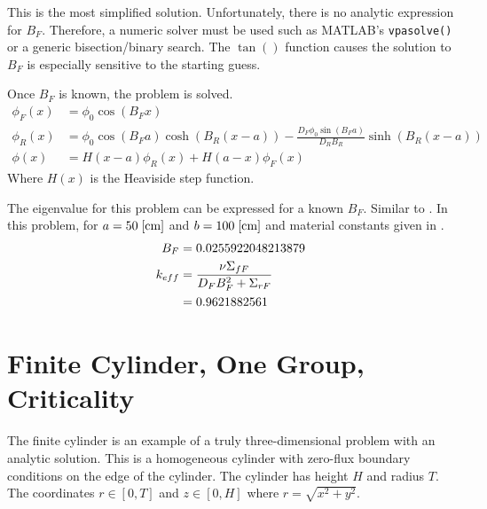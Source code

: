   This is the most simplified solution. Unfortunately, there is no analytic
  expression for $B_F$. Therefore, a numeric solver must be used such as 
  MATLAB's \texttt{vpasolve()} or a generic bisection/binary search. The $\tan()$ 
  function causes the solution to $B_F$ is especially sensitive to the starting
  guess.
  
  Once $B_F$ is known, the problem is solved.
  \begin{align}
    \phi_F(x) &= \phi_0 \cos(B_F x)\\
    \phi_R(x) &= \phi_0 \cos(B_F a) \cosh(B_R (x-a)) 
      - \frac{D_F \phi_0 \sin(B_F a)}{D_R B_R} \sinh(B_R (x-a))\\
    \label{eq:analytic_2reg}
    \phi(x) &= H(x-a)\phi_R(x) + H(a-x)\phi_F(x)
  \end{align}
  Where $H(x)$ is the Heaviside step function.  
  
  The eigenvalue for this problem can be expressed for a known $B_F$. Similar 
  to . In this problem, for $a=50 \;\text{[{cm}]}$ and
  $b=100 \;\text{[{cm}]}$ and material constants given in .
  \begin{align}
    B_F &= 0.0255922048213879 \\
    k_{eff} &= \frac{\nu\Sigma_{fF}}{D_F B_F^2 + \Sigma_{rF}} \\
    &= 0.9621882561
  \end{align}
  
\section{Finite Cylinder, One Group, Criticality}
  \label{sec:deriv_finite_cyl}
  The finite cylinder is an example of a truly three-dimensional problem with
  an analytic solution. This is a homogeneous cylinder with zero-flux boundary
  conditions on the edge of the cylinder. The cylinder has height $H$ and 
  radius $T$. The coordinates $r\in[0,T]$ and $z\in[0,H]$ where 
  $r=\sqrt{x^2+y^2}$.
  
